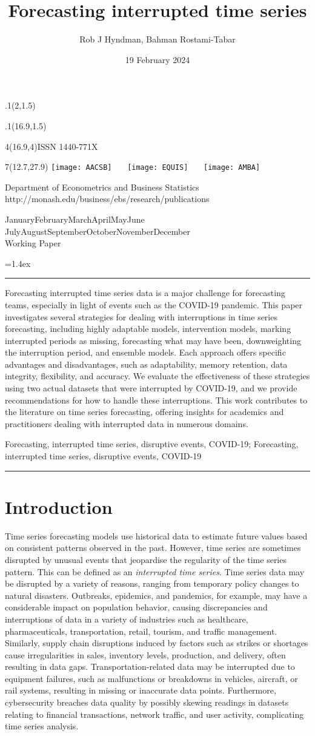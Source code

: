 \documentclass[
  11pt,
  a4paper,
]{article}
\title{Forecasting interrupted time series}
\date{19 February 2024}
\author{Rob J Hyndman, Bahman Rostami-Tabar}
\makeatletter
\def\placefig#1#2#3#4{\begin{textblock}{.1}(#1,#2)\rlap{\texttt{[image: \#4]}}\end{textblock}}
\def\Date{\number\day}
\def\Month{\ifcase\month\or
 January\or February\or March\or April\or May\or June\or
 July\or August\or September\or October\or November\or December\fi}
\def\Year{\number\year}
\def\showjel{{\large\textsf{\textbf{JEL classification:}}~\@jel}}
\def\cover{{\sffamily\setcounter{page}{0}
        \thispagestyle{empty}
        \placefig{2}{1.5}{width=5cm}{monash2}
        \placefig{16.9}{1.5}{width=2.1cm}{MBSportrait}
        \begin{textblock}{4}(16.9,4)ISSN 1440-771X\end{textblock}
        \begin{textblock}{7}(12.7,27.9)\hfill
        \texttt{[image: AACSB]}~~~
        \texttt{[image: EQUIS]}~~~
        \texttt{[image: AMBA]}
        \end{textblock}
        \vspace*{2.5cm}
        \begin{center}\Large
        Department of Econometrics and Business Statistics\\[.5cm]
        \footnotesize http://monash.edu/business/ebs/research/publications
        \end{center}\vspace{2cm}
        \begin{center}
        \fbox{\parbox{14cm}{\begin{onehalfspace}\centering\Huge\vspace*{0.3cm}
                \textsf{\textbf{\expandafter{\@title}}}\vspace{1cm}\par
                \LARGE
                \expandafter{\@author}
                \end{onehalfspace}
        }}
        \end{center}
        \vfill
                \begin{center}\Large
                \Month~\Year\\[1cm]
                Working Paper \@wp
        \end{center}\vspace*{2cm}}}
\def\pageone{{\sffamily\setstretch{1}%
        \thispagestyle{empty}%
        \vbox to \textheight{%
        \raggedright\baselineskip=1.2cm
     {\fontsize{24.88}{30}\sffamily\textbf{\expandafter{\@title}}}
        \vspace{2cm}\par
        \hspace{1cm}\parbox{14cm}{\sffamily\large\@addresses}\vspace{1cm}\vfill
        \hspace{1cm}{\large\Date~\Month~\Year}\\[1cm]
        \hspace{1cm}\showjel\vss}}}
\def\blindtitle{{\sffamily
     \thispagestyle{plain}\raggedright\baselineskip=1.2cm
     {\fontsize{24.88}{30}\sffamily\textbf{\expandafter{\@title}}}\vspace{1cm}\par
        }}
\def\titlepage{{\cover\newpage\pageone\newpage\blindtitle}}
\let\maketitle\titlepage
\newenvironment{keywords}{\par\vspace{0.5cm}\noindent{\sffamily\textbf{Keywords:}}}{\vspace{0.25cm}\par\hrule\vspace{0.5cm}\par}
\renewenvironment{abstract}{\begin{minipage}{\textwidth}\parskip=1.4ex\noindent
\hrule\vspace{0.1cm}\par{\sffamily\textbf{\abstractname}}\newline\setstretch{1.5}}
  {\end{minipage}}
\makeatother
\begin{document}
\maketitle

\begin{abstract}
Forecasting interrupted time series data is a major challenge for
forecasting teams, especially in light of events such as the COVID-19
pandemic. This paper investigates several strategies for dealing with
interruptions in time series forecasting, including highly adaptable
models, intervention models, marking interrupted periods as missing,
forecasting what may have been, downweighting the interruption period,
and ensemble models. Each approach offers specific advantages and
disadvantages, such as adaptability, memory retention, data integrity,
flexibility, and accuracy. We evaluate the effectiveness of these
strategies using two actual datasets that were interrupted by COVID-19,
and we provide recommendations for how to handle these interruptions.
This work contributes to the literature on time series forecasting,
offering insights for academics and practitioners dealing with
interrupted data in numerous domains.
\end{abstract}

\begin{keywords}
  Forecasting, interrupted time series, disruptive events, COVID-19; 
  Forecasting, interrupted time series, disruptive events, COVID-19
\end{keywords}

\section{Introduction}\label{sec-introduction}

Time series forecasting models use historical data to estimate future
values \autocite{fildes2008forecasting} based on consistent patterns
observed in the past. However, time series are sometimes disrupted by
unusual events that jeopardise the regularity of the time series
pattern. This can be defined as an \emph{interrupted time series}. Time
series data may be disrupted by a variety of reasons, ranging from
temporary policy changes to natural disasters. Outbreaks, epidemics, and
pandemics, for example, may have a considerable impact on population
behavior, causing discrepancies and interruptions of data in a variety
of industries such as healthcare, pharmaceuticals, transportation,
retail, tourism, and traffic management. Similarly, supply chain
disruptions induced by factors such as strikes or shortages cause
irregularities in sales, inventory levels, production, and delivery,
often resulting in data gaps. Transportation-related data may be
interrupted due to equipment failures, such as malfunctions or
breakdowns in vehicles, aircraft, or rail systems, resulting in missing
or inaccurate data points. Furthermore, cybersecurity breaches data
quality by possibly skewing readings in datasets relating to financial
transactions, network traffic, and user activity, complicating time
series analysis.
\end{document}
